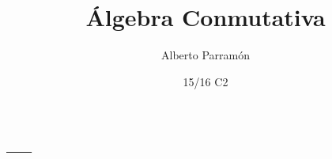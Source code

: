 \documentclass[palatino]{apuntes}
\title{Álgebra Conmutativa}
\author{Alberto Parramón}
\date{15/16 C2}
\begin{document}
\pagestyle{plain}
\maketitle

\tableofcontents
\newpage

\appendix

\chapter{---}


\nocite{reidAG,reidCA,apuntesEA}
{}

\printindex
\end{document}
